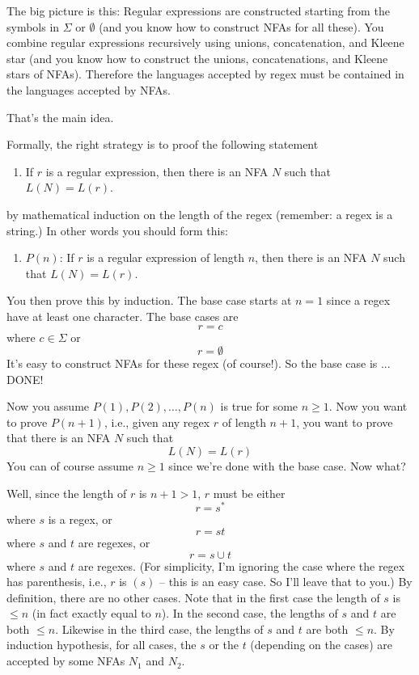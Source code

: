 



\newpage
The big picture is this:
Regular expressions are constructed starting from the symbols in $\Sigma$
or $\emptyset$
(and you know how to construct NFAs for all these).
You combine regular expressions recursively using
unions, concatenation, and Kleene star (and you know how to 
construct the unions, concatenations, and Kleene stars of NFAs).
Therefore the languages accepted by regex must be contained in the 
languages accepted by NFAs.

That's the main idea.

Formally, the right strategy is to proof the following statement
\begin{enumerate}
\item[]
If $r$ is a regular expression, then there is an NFA $N$
such that $L(N) = L(r)$.
\end{enumerate}
by mathematical induction on the length of the regex 
(remember: a regex is a string.)
In other words you should form this:
\begin{enumerate}
\item[]
$P(n)$: If $r$ is a regular expression of length $n$, 
then there is an NFA $N$
such that $L(N) = L(r)$.
\end{enumerate}

You then prove this by induction.
The base case starts at $n = 1$ since a regex have at least one character.
The base cases are 
\[
r = c
\]
where $c \in \Sigma$ or
\[
r = \emptyset
\]
It's easy to construct NFAs for these regex (of course!).
So the base case is ... DONE!

Now you assume $P(1), P(2), \ldots, P(n)$ is true for some $n \geq 1$.
Now you want to prove $P(n+1)$, i.e., 
given any regex $r$ of length $n + 1$, you want to 
prove that there is an NFA $N$ such that
\[
L(N) = L(r)
\]
You can of course assume $n \geq 1$ since we're done with the base case.
Now what?

Well, since the length of $r$ is $n + 1 > 1$, $r$ must be either
\[
r = s^*
\]
where $s$ is a regex, or
\[
r = st
\]
where $s$ and $t$ are regexes, or
\[
r = s \cup t
\]
where $s$ and $t$ are regexes.
(For simplicity, I'm ignoring the case where the regex has parenthesis,
i.e., $r$ is $(s)$ -- this is an easy case. So I'll leave that to you.)
By definition, there are no other cases.
Note that in the first case the length of $s$ is $\leq n$ (in fact
exactly equal to $n$).
In the second case, the lengths of $s$ and $t$ are both $\leq n$.
Likewise in the third case, the lengths of $s$ and $t$ are both $\leq n$.
By induction hypothesis, for all cases, the $s$ or the $t$
(depending on the cases) are accepted by some NFAs $N_1$ and $N_2$.

